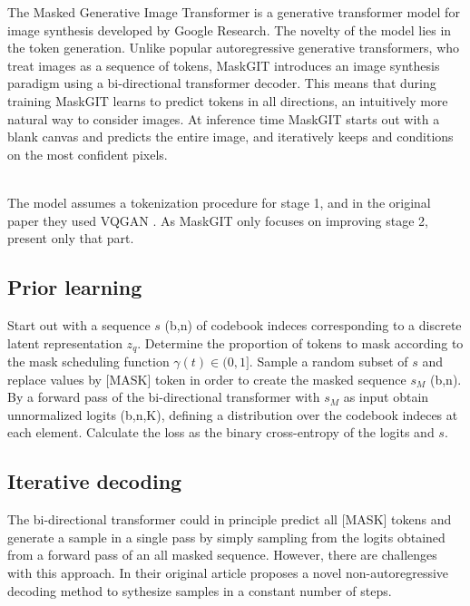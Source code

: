 \documentclass[../../thesis.tex]{subfiles}
\begin{document}
The Masked Generative Image Transformer is a generative transformer model for image synthesis developed by Google Research. The novelty of the model lies in the token generation. Unlike popular autoregressive generative transformers, who treat images as a sequence of tokens, MaskGIT introduces an image synthesis paradigm using a bi-directional transformer decoder. This means that during training MaskGIT learns to predict tokens in all directions, an intuitively more natural way to consider images. At inference time MaskGIT starts out with a blank canvas and predicts the entire image, and iteratively keeps and conditions on the most confident pixels.\\\\


The model assumes a tokenization procedure for stage 1, and in the original paper they used VQGAN \cite{VQGAN}. As MaskGIT only focuses on improving stage 2, present only that part. 

\subsection{Prior learning}

Start out with a sequence $s$ (b,n) of codebook indeces corresponding to a discrete latent representation $z_q$. Determine the proportion of tokens to mask according to the mask scheduling function $\gamma(t)\in (0,1]$. 
Sample a random subset of $s$ and replace values by [MASK] token in order to create the masked sequence $s_M$ (b,n). By a forward pass of the bi-directional transformer with $s_M$ as input obtain unnormalized logits (b,n,K), defining a distribution over the codebook indeces at each element. Calculate the loss as the binary cross-entropy of the logits and $s$. 

\subsection{Iterative decoding}

The bi-directional transformer could in principle predict all [MASK] tokens and generate a sample in a single pass by simply sampling from the logits obtained from a forward pass of an all masked sequence. However, there are challenges with this approach. In their original article  \cite{chang2022maskgit} proposes a novel non-autoregressive decoding method to sythesize samples in a constant number of steps.\\\\
\end{document}
